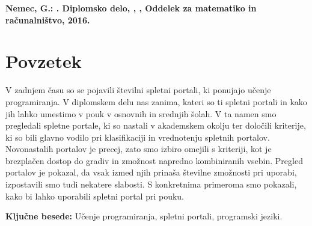 \textbf{Nemec, G.: \podnaslov. Diplomsko delo, \univerza, \fakulteta,
Oddelek za matematiko in računalništvo, 2016.}

\section*{Povzetek}
\label{sec:povzetek}

V zadnjem času so se pojavili številni spletni portali, ki ponujajo učenje
programiranja. V diplomskem delu nas zanima, kateri so ti spletni portali in
kako jih lahko umestimo v pouk v osnovnih in srednjih šolah. V ta namen smo
pregledali spletne portale, ki so nastali v akademskem okolju ter določili
kriterije, ki so bili glavno vodilo pri klasifikaciji in vrednotenju spletnih
portalov. Novonastalih portalov je precej, zato smo izbiro omejili s kriteriji,
kot je brezplačen dostop do gradiv in zmožnost napredno kombiniranih vsebin.
Pregled portalov je pokazal, da vsak izmed njih prinaša številne zmožnosti pri
uporabi, izpostavili smo tudi nekatere slabosti. S konkretnima primeroma smo
pokazali, kako bi lahko uporabili spletni portal pri pouku.


\textbf{Ključne besede:} Učenje programiranja, spletni portali, programski
jeziki. 

